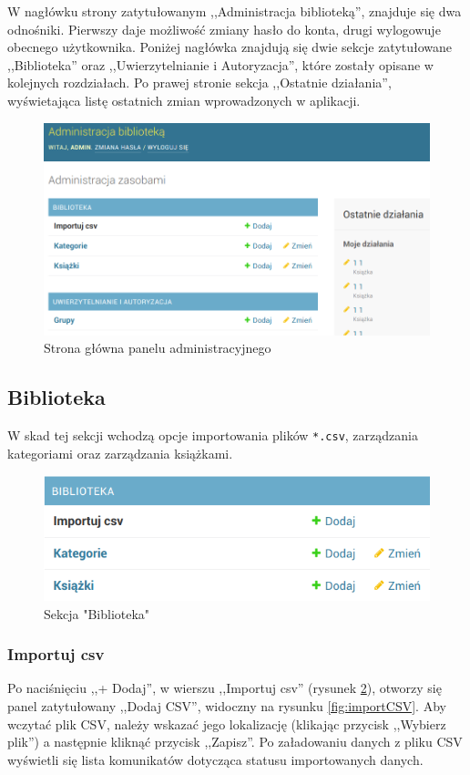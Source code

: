 \documentclass[twoside]{projektInzynierskiMS}
\begin{document}
W nagłówku strony zatytułowanym ,,Administracja biblioteką'', znajduje się dwa odnośniki. Pierwszy daje możliwość zmiany hasło do konta, drugi wylogowuje obecnego użytkownika. Poniżej nagłówka znajdują się dwie sekcje zatytułowane ,,Biblioteka'' oraz ,,Uwierzytelnianie i Autoryzacja'', które zostały opisane w kolejnych rozdziałach. Po prawej stronie sekcja ,,Ostatnie działania'', wyświetająca listę ostatnich zmian wprowadzonych w aplikacji.


\begin{figure}[h]
  \centering
  \includegraphics[width=0.6\linewidth]{img/backend/PanelAdmin.png}
  \caption{Strona główna panelu administracyjnego}
  \label{fig:adminPanel}
\end{figure}

\subsection{Biblioteka}
W skad tej sekcji wchodzą opcje importowania plików \verb`*.csv`, zarządzania kategoriami oraz zarządzania książkami.

\begin{figure}[h]
  \centering
  \includegraphics[width=0.6\linewidth]{img/backend/biblioteka.png}
  \caption{Sekcja "Biblioteka"}
  \label{fig:biblioteka}
\end{figure}

\subsubsection{Importuj csv}
Po naciśnięciu ,,+ Dodaj'', w wierszu ,,Importuj csv'' (rysunek \ref{fig:biblioteka}), otworzy się panel zatytułowany ,,Dodaj CSV'', widoczny na rysunku \ref{fig:importCSV}. Aby wczytać plik CSV, należy wskazać jego lokalizację (klikając przycisk ,,Wybierz plik'') a następnie kliknąć przycisk ,,Zapisz''. Po załadowaniu danych z pliku CSV wyświetli się lista komunikatów dotycząca statusu importowanych danych. 
\end{document}
